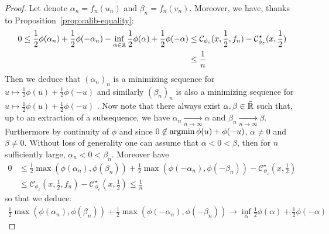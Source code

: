 \begin{proof}
    Let denote $\alpha_n = f_n(u_n)$ and $\beta_n = f_n(v_n)$. %
    Moreover, we have, thanks to Proposition~\ref{prop:calib-equality}:
    \begin{align*}
      0\leq \frac12 \phi(\alpha_n) +  \frac12 \phi(-\alpha_n)- \inf_{\alpha\in\mathbb{R}}\frac12 \phi(\alpha)+\frac12\phi(-\alpha)&\leq \mathcal{C}_{\phi_\varepsilon}(x,\frac12,f_n) - \mathcal{C}_{\phi_\varepsilon}^\star(x,\frac12)\\
      &\leq \frac1n
    \end{align*}
    Then we deduce that $(\alpha_n)_n$ is a minimizing sequence for  $u\mapsto\frac12\phi(u)+\frac12\phi(-u)$ and similarly $(\beta_n)_n$ is also a minimizing sequence for  $u\mapsto\frac12\phi(u)+\frac12\phi(-u)$ . Now note that there always exist $\alpha, \beta\in \bar{\mathbb{R}}$ such that, up to an extraction of a subsequence, we have $\alpha_n\xrightarrow[n\to\infty]{} \alpha$ and $\beta_n \xrightarrow[n\to\infty]{} \beta$. Furthermore by continuity of $\phi$ and since $0\not\in\operatorname*{argmin}\phi(u)+\phi(-u)$, $\alpha\neq0$ and $\beta\neq 0$. Without loss of generality one can assume that $\alpha<0<\beta$, then for $n$ sufficiently large, $\alpha_n<0<\beta_n$. Moreover have 
    \begin{align*}
         0&\leq\frac12\max\left(\phi(\alpha_n),\phi(\beta_n)\right)+\frac12\max\left(\phi(-\alpha_n),\phi(-\beta_n)\right)- \mathcal{C}^\star_{\phi_\varepsilon}(x,\frac12)\\
         &\leq \mathcal{C}_{\phi_\varepsilon}(x,\frac12,f_n) - \mathcal{C}_{\phi_\varepsilon}^\star(x,\frac12)\leq \frac1n
    \end{align*}
    so that we deduce:
    \begin{align}
    \label{eq:limitalphabeta}
     \frac12\max\left(\phi(\alpha_n),\phi(\beta_n)\right)+\frac12\max\left(\phi(-\alpha_n),\phi(-\beta_n)\right)\longrightarrow \inf_\alpha \frac12\phi(\alpha)+\frac12\phi(-\alpha) 
    \end{align}
    

\end{proof}
